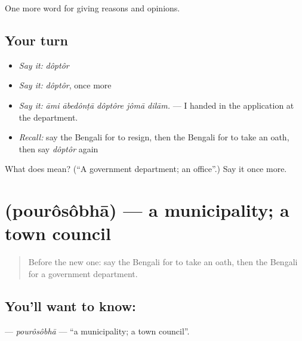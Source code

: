 \begin{grammarlens}[title={What you've built}]
One more word for giving reasons and opinions.
\end{grammarlens}

\subsection*{Your turn}
\begin{itemize}
\raggedright
  \item \emph{Say it:} \emph{dôptôr}
  \item \emph{Say it:} \emph{dôptôr}, once more
  \item \emph{Say it:} \emph{āmi ābedônṭā dôptôre jômā dilām.} — I handed in the application at the department.
  \item \emph{Recall:} say the Bengali for to resign, then the Bengali for to take an oath, then say \emph{dôptôr} again
\end{itemize}

\begin{tcolorbox}[breakable,colback=teal!4,colframe=teal!35!black,title={Before you move on}]
What does  mean? (\textquotedblleft{}A government department; an office\textquotedblright{}.) Say it once more.
\end{tcolorbox}
\section[\texorpdfstring{\bn{পৌরসভা} (pourôsôbhā)}{পৌরসভা (pourôsôbhā)}]{ (pourôsôbhā) — a municipality; a town council}

\label{lesson:BN-C347-pourosobha}



\begin{quote}
Before the new one: say the Bengali for to take an oath, then the Bengali for a government department.
\end{quote}

\subsection*{You'll want to know: }
\textbf{} — \emph{pourôsôbhā} — \textquotedblleft{}a municipality; a town council\textquotedblright{}.

\begin{quote}
     
\end{quote}

